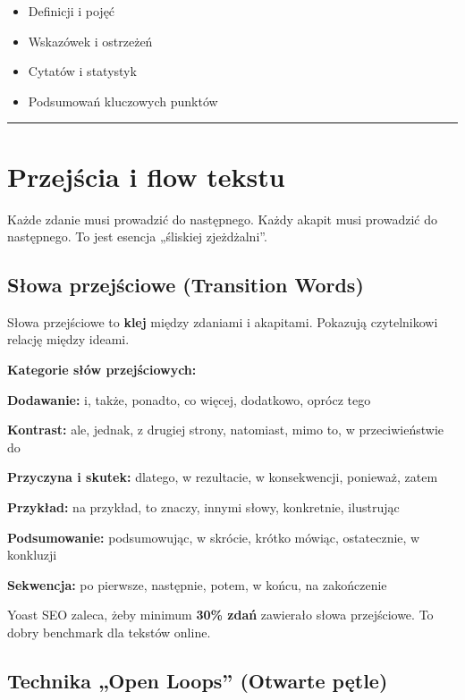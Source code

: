 \documentclass[
  12pt,
  a4paper,
  twoside,
  openright,
  12pt,
  DIV=12,
  BCOR=12mm]{scrbook}
\providecommand{\tightlist}{%
  \setlength{\itemsep}{0pt}\setlength{\parskip}{0pt}}\usepackage{longtable,booktabs,array}
\newcommand{\decoline}{%
  \begin{center}
    \textcolor{bordergray}{\rule{0.3\textwidth}{0.5pt}}
  \end{center}
}
\begin{document}
\begin{itemize}
\tightlist
\item
  Definicji i pojęć
\item
  Wskazówek i ostrzeżeń
\item
  Cytatów i statystyk
\item
  Podsumowań kluczowych punktów
\end{itemize}

\decoline

\section{Przejścia i flow tekstu}\label{przejux15bcia-i-flow-tekstu}

Każde zdanie musi prowadzić do następnego. Każdy akapit musi prowadzić
do następnego. To jest esencja „śliskiej zjeżdżalni''.

\subsection{Słowa przejściowe (Transition
Words)}\label{sux142owa-przejux15bciowe-transition-words}

Słowa przejściowe to \textbf{klej} między zdaniami i akapitami. Pokazują
czytelnikowi relację między ideami.

\textbf{Kategorie słów przejściowych:}

\textbf{Dodawanie:} i, także, ponadto, co więcej, dodatkowo, oprócz tego

\textbf{Kontrast:} ale, jednak, z drugiej strony, natomiast, mimo to, w
przeciwieństwie do

\textbf{Przyczyna i skutek:} dlatego, w rezultacie, w konsekwencji,
ponieważ, zatem

\textbf{Przykład:} na przykład, to znaczy, innymi słowy, konkretnie,
ilustrując

\textbf{Podsumowanie:} podsumowując, w skrócie, krótko mówiąc,
ostatecznie, w konkluzji

\textbf{Sekwencja:} po pierwsze, następnie, potem, w końcu, na
zakończenie

\begin{wskazowka}
Yoast SEO zaleca, żeby minimum \textbf{30\% zdań} zawierało słowa przejściowe. To dobry benchmark dla tekstów online.
\end{wskazowka}

\subsection{Technika „Open Loops'' (Otwarte
pętle)}\label{technika-open-loops-otwarte-pux119tle}
\end{document}
